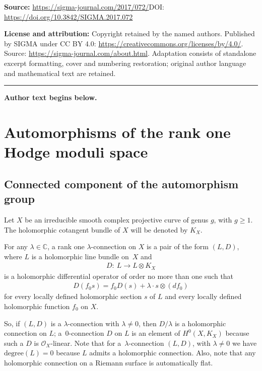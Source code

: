\documentclass[11pt]{article}
\numberwithin{equation}{section}
\begin{document}
\noindent\textbf{Source:} \url{https://sigma-journal.com/2017/072/}\quad DOI: \url{https://doi.org/10.3842/SIGMA.2017.072}\par
\noindent\textbf{License and attribution:} Copyright retained by the named authors. Published by SIGMA under CC BY 4.0: \url{https://creativecommons.org/licenses/by/4.0/}. Source: \url{https://sigma-journal.com/about.html}. Adaptation consists of standalone excerpt formatting, cover and numbering restoration; original author language and mathematical text are retained.\par
\medskip\hrule\medskip\noindent\textbf{Author text begins below.}\par
\setcounter{section}{1}
\setcounter{subsection}{0}
\setcounter{subsubsection}{0}
\setcounter{Theorem}{5}
\setcounter{equation}{0}
\section{Automorphisms of the rank one Hodge moduli space}\label{auto-hodge}

\subsection{Connected component of the automorphism group}

Let $X$ be an irreducible smooth complex projective curve of genus $g$, with $g \geq 1$. The holomorphic cotangent bundle of $X$ will be denoted by $K_X$.
\begin{Definition} For any $\lambda \in \mathbb C$, a rank one $\lambda$-connection on $X$ is a pair of the form $(L, D)$, where $L$ is a holomorphic line bundle on~$X$ and
\begin{gather*}
D \colon \ L \longrightarrow L\otimes K_X
\end{gather*}
is a holomorphic dif\/ferential operator of order no more than one such that
\begin{gather*}
D(f_0s) = f_0D(s)+\lambda\cdot s\otimes (df_0)
\end{gather*}
for every locally def\/ined holomorphic section $s$ of $L$ and every locally def\/ined holomorphic function $f_0$ on $X$.
\end{Definition}

So, if $(L, D)$ is a $\lambda$-connection with $\lambda \not= 0$, then $D/\lambda$ is a holomorphic connection on $L$; a~$0$-connection $D$ on $L$ is an element of $H^0(X, K_X)$ because such a $D$ is ${\mathcal O}_X$-linear. Note that for a~$\lambda$-connection $(L, D)$, with $\lambda \not= 0$ we have $\text{degree}(L) = 0$ because $L$ admits a holomorphic connection. Also, note that any holomorphic connection on a Riemann surface is automatically f\/lat.
\end{document}
